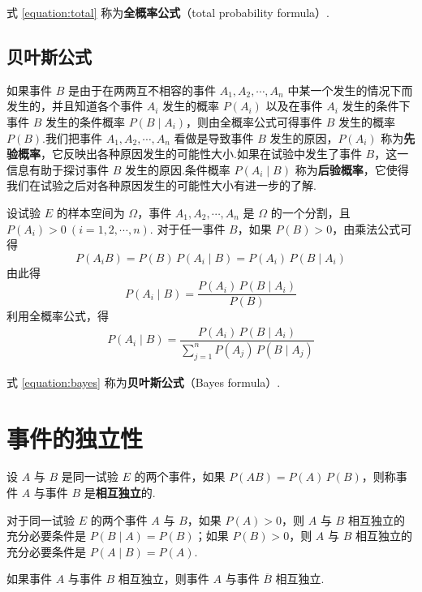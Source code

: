 式 \eqref{equation:total} 称为\textbf{全概率公式}（total probability formula）.

\subsection{贝叶斯公式}

如果事件 $B$ 是由于在两两互不相容的事件 $A_1,A_2,\cdots,A_n$ 中某一个发生的情况下而发生的，并且知道各个事件 $A_i$ 发生的概率 $P(A_i)$ 以及在事件 $A_i$ 发生的条件下事件 $B$ 发生的条件概率 $P(B \mid A_i)$，则由全概率公式可得事件 $B$ 发生的概率 $P(B)$.我们把事件 $A_1,A_2,\cdots,A_n$ 看做是导致事件 $B$ 发生的原因，$P(A_i)$ 称为\textbf{先验概率}，它反映出各种原因发生的可能性大小.如果在试验中发生了事件 $B$，这一信息有助于探讨事件 $B$ 发生的原因.条件概率 $P(A_i \mid B)$ 称为\textbf{后验概率}，它使得我们在试验之后对各种原因发生的可能性大小有进一步的了解.

设试验 $E$ 的样本空间为 $\varOmega$，事件 $A_1,A_2,\cdots,A_n$ 是 $\varOmega$ 的一个分割，且 $P(A_i)>0 \ (i=1,2,\cdots,n)$. 对于任一事件 $B$，如果 $P(B)>0$，由乘法公式可得
$$
P(A_i B) = P(B) \, P(A_i \mid B) = P(A_i) \, P(B \mid A_i)
$$
由此得
$$
P(A_i \mid B)=\dfrac{P(A_i) \, P(B \mid A_i)}{P(B)}
$$
利用全概率公式，得
\begin{gather} \label{equation:bayes}
    P(A_i \mid B) = \dfrac{P(A_i) \, P(B \mid A_i)}{\displaystyle\sum_{j=1}^n P(A_j) \, P(B \mid A_j)}
\end{gather}

式 \eqref{equation:bayes} 称为\textbf{贝叶斯公式}（Bayes formula）.

\section{事件的独立性}

\begin{definition} \label{def:event-independence}
    设 $A$ 与 $B$ 是同一试验 $E$ 的两个事件，如果 $P(AB)=P(A)\,P(B)$，则称事件 $A$ 与事件 $B$ 是\textbf{相互独立}的.
\end{definition}

对于同一试验 $E$ 的两个事件 $A$ 与 $B$，如果 $P(A)>0$，则 $A$ 与 $B$ 相互独立的充分必要条件是 $P(B \mid A)=P(B)$；如果 $P(B)>0$，则 $A$ 与 $B$ 相互独立的充分必要条件是 $P(A \mid B)=P(A)$.

\begin{conclusion}
    如果事件 $A$ 与事件 $B$ 相互独立，则事件 $A$ 与事件 $\overline{B}$ 相互独立.
\end{conclusion}

